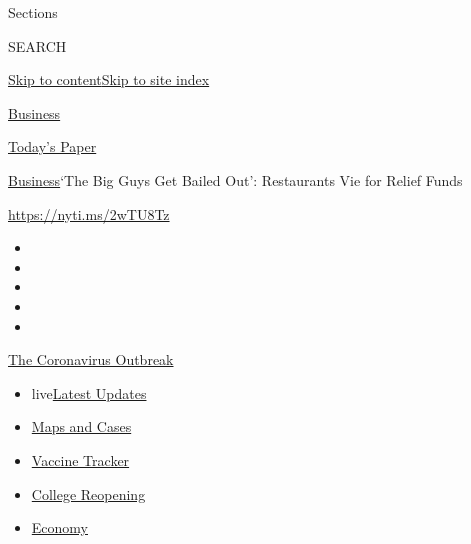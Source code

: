 Sections

SEARCH

\protect\hyperlink{site-content}{Skip to
content}\protect\hyperlink{site-index}{Skip to site index}

\href{https://www.nytimes.com/section/business}{Business}

\href{https://myaccount.nytimes.com/auth/login?response_type=cookie\&client_id=vi}{}

\href{https://www.nytimes.com/section/todayspaper}{Today's Paper}

\href{/section/business}{Business}\textbar{}`The Big Guys Get Bailed
Out': Restaurants Vie for Relief Funds

\url{https://nyti.ms/2wTU8Tz}

\begin{itemize}
\item
\item
\item
\item
\item
\end{itemize}

\href{https://www.nytimes.com/news-event/coronavirus?action=click\&pgtype=Article\&state=default\&region=TOP_BANNER\&context=storylines_menu}{The
Coronavirus Outbreak}

\begin{itemize}
\tightlist
\item
  live\href{https://www.nytimes.com/2020/08/04/world/coronavirus-covid-19.html?action=click\&pgtype=Article\&state=default\&region=TOP_BANNER\&context=storylines_menu}{Latest
  Updates}
\item
  \href{https://www.nytimes.com/interactive/2020/us/coronavirus-us-cases.html?action=click\&pgtype=Article\&state=default\&region=TOP_BANNER\&context=storylines_menu}{Maps
  and Cases}
\item
  \href{https://www.nytimes.com/interactive/2020/science/coronavirus-vaccine-tracker.html?action=click\&pgtype=Article\&state=default\&region=TOP_BANNER\&context=storylines_menu}{Vaccine
  Tracker}
\item
  \href{https://www.nytimes.com/2020/08/02/us/covid-college-reopening.html?action=click\&pgtype=Article\&state=default\&region=TOP_BANNER\&context=storylines_menu}{College
  Reopening}
\item
  \href{https://www.nytimes.com/live/2020/08/03/business/stock-market-today-coronavirus?action=click\&pgtype=Article\&state=default\&region=TOP_BANNER\&context=storylines_menu}{Economy}
\end{itemize}

